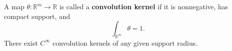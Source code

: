 A map $\theta: \mathbb{R}^m \to \mathbb{R}$ is called a \textbf{convolution kernel} if it is nonnegative, has compact support, and
$$
\int_{\mathbb{R}^m} \theta = 1.
$$
There exist $C^\infty$ convolution kernels of any given support radius.
